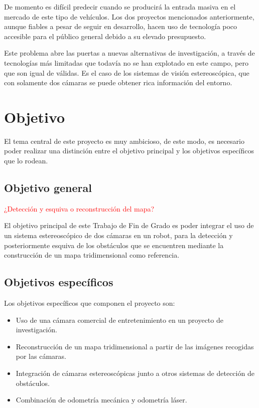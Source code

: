 De momento es difícil predecir cuando se producirá la entrada masiva en el
mercado de este tipo de vehículos. Los dos proyectos mencionados anteriormente, aunque fiables a pesar de seguir en desarrollo, hacen uso de tecnología poco
accesible para el público general debido a su elevado presupuesto.

Este problema abre las puertas a nuevas alternativas de investigación, a través
de tecnologías más limitadas que todavía no se han explotado en este campo, pero
que son igual de válidas. Es el caso de los sistemas de visión estereoscópica,
que con solamente dos cámaras se puede obtener rica información del entorno.


\section{Objetivo}
\label{1:sec:3}

El tema central de este proyecto es muy ambicioso, de este modo, es necesario
poder realizar una distinción entre el objetivo principal y los objetivos
específicos que lo rodean.

\subsection{Objetivo general}

\textcolor{red}{¿Detección y esquiva o reconstrucción del mapa?}

El objetivo principal de este Trabajo de Fin de Grado es poder integrar el uso
de un sistema estereoscópico de dos cámaras en un robot, para la detección y
posteriormente esquiva de los obstáculos que se encuentren mediante la
construcción de un mapa tridimensional como referencia.

\subsection{Objetivos específicos}

Los objetivos específicos que componen el proyecto son:
\begin{itemize}
  \item Uso de una cámara comercial de entretenimiento en un proyecto de
  investigación.
  \item Reconstrucción de un mapa tridimensional a partir de las imágenes
  recogidas por las cámaras.
  \item Integración de cámaras estereoscópicas junto a otros sistemas de
  detección de obstáculos.
  \item Combinación de odometría mecánica y odometría láser.
\end{itemize}


